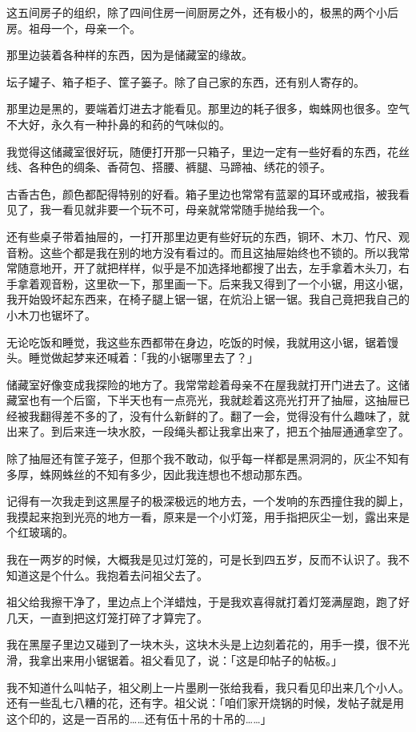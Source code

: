 \documentclass[UTF8]{ctexart}
\begin{document}
这五间房子的组织，除了四间住房一间厨房之外，还有极小的，极黑的两个小后房。祖母一个，母亲一个。

那里边装着各种样的东西，因为是储藏室的缘故。

坛子罐子、箱子柜子、筐子篓子。除了自己家的东西，还有别人寄存的。

那里边是黑的，要端着灯进去才能看见。那里边的耗子很多，蜘蛛网也很多。空气不大好，永久有一种扑鼻的和药的气味似的。

我觉得这储藏室很好玩，随便打开那一只箱子，里边一定有一些好看的东西，花丝线、各种色的绸条、香荷包、搭腰、裤腿、马蹄袖、绣花的领子。

古香古色，颜色都配得特别的好看。箱子里边也常常有蓝翠的耳环或戒指，被我看见了，我一看见就非要一个玩不可，母亲就常常随手抛给我一个。

还有些桌子带着抽屉的，一打开那里边更有些好玩的东西，铜环、木刀、竹尺、观音粉。这些个都是我在别的地方没有看过的。而且这抽屉始终也不锁的。所以我常常随意地开，开了就把样样，似乎是不加选择地都搜了出去，左手拿着木头刀，右手拿着观音粉，这里砍一下，那里画一下。后来我又得到了一个小锯，用这小锯，我开始毁坏起东西来，在椅子腿上锯一锯，在炕沿上锯一锯。我自己竟把我自己的小木刀也锯坏了。

无论吃饭和睡觉，我这些东西都带在身边，吃饭的时候，我就用这小锯，锯着馒头。睡觉做起梦来还喊着：「我的小锯哪里去了？」

储藏室好像变成我探险的地方了。我常常趁着母亲不在屋我就打开门进去了。这储藏室也有一个后窗，下半天也有一点亮光，我就趁着这亮光打开了抽屉，这抽屉已经被我翻得差不多的了，没有什么新鲜的了。翻了一会，觉得没有什么趣味了，就出来了。到后来连一块水胶，一段绳头都让我拿出来了，把五个抽屉通通拿空了。

除了抽屉还有筐子笼子，但那个我不敢动，似乎每一样都是黑洞洞的，灰尘不知有多厚，蛛网蛛丝的不知有多少，因此我连想也不想动那东西。

记得有一次我走到这黑屋子的极深极远的地方去，一个发响的东西撞住我的脚上，我摸起来抱到光亮的地方一看，原来是一个小灯笼，用手指把灰尘一划，露出来是个红玻璃的。

我在一两岁的时候，大概我是见过灯笼的，可是长到四五岁，反而不认识了。我不知道这是个什么。我抱着去问祖父去了。

祖父给我擦干净了，里边点上个洋蜡烛，于是我欢喜得就打着灯笼满屋跑，跑了好几天，一直到把这灯笼打碎了才算完了。

我在黑屋子里边又碰到了一块木头，这块木头是上边刻着花的，用手一摸，很不光滑，我拿出来用小锯锯着。祖父看见了，说：「这是印帖子的帖板。」

我不知道什么叫帖子，祖父刷上一片墨刷一张给我看，我只看见印出来几个小人。还有一些乱七八糟的花，还有字。祖父说：「咱们家开烧锅的时候，发帖子就是用这个印的，这是一百吊的……还有伍十吊的十吊的……」
\end{document}
